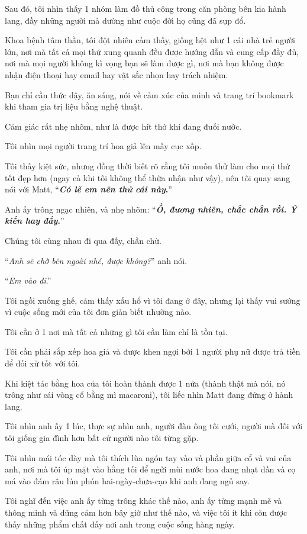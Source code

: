 \documentclass{article}
\begin{document}
Sau đó, tôi nhìn thấy 1 nhóm làm đồ thủ công trong căn phòng bên kia hành lang, đầy những người mà dường như cuộc đời họ cũng đã sụp đổ.

%
Khoa bệnh tâm thần, tôi đột nhiên cảm thấy, giống hệt như 1 cái nhà trẻ người lớn, nơi mà tất cả mọi thứ xung quanh đều được hướng dẫn và cung cấp đầy đủ, nơi mà mọi người không kì vọng bạn sẽ làm được gì, nơi mà bạn không được nhận điện thoại hay email hay vật sắc nhọn hay trách nhiệm.

Bạn chỉ cần thức dậy, ăn sáng, nói về cảm xúc của mình và trang trí bookmark khi tham gia trị liệu bằng nghệ thuật.

Cảm giác rất nhẹ nhõm, như là được hít thở khi đang đuối nước.

Tôi nhìn mọi người trang trí hoa giả lên mấy cục xốp.

Tôi thấy kiệt sức, nhưng đồng thời biết rõ rằng tôi muốn thử làm cho mọi thứ tốt đẹp hơn (ngay cả khi tôi không thể thừa nhận như vậy), nên tôi quay sang nói với Matt, ``\textbf{\textit{Có lẽ em nên thử cái này}.}''

Anh ấy trông ngạc nhiên, và nhẹ nhõm: ``\textbf{\textit{Ồ, đương nhiên, chắc chắn rồi. Ý kiến hay đấy}.}''

%
Chúng tôi cùng nhau đi qua đấy, chần chừ.

``\textit{Anh sẽ chờ bên ngoài nhé, được không?}'' anh nói.

``\textit{Em vào đi}.''

Tôi ngồi xuống ghế, cảm thấy xấu hổ vì tôi đang ở đây, nhưng lại thấy vui sướng vì cuộc sống mới của tôi đơn giản biết nhường nào.

Tôi cần ở 1 nơi mà tất cả những gì tôi cần làm chỉ là tồn tại.

Tôi cần phải sắp xếp hoa giả và được khen ngợi bởi 1 người phụ nữ được trả tiền để đối xử tốt với tôi.

Khi kiệt tác bằng hoa của tôi hoàn thành được 1 nửa (thành thật mà nói, nó trông như cái vòng cổ bằng mì macaroni), tôi liếc nhìn Matt đang đứng ở hành lang.

Tôi nhìn anh ấy 1 lúc, thực sự nhìn anh, người đàn ông tôi cưới, người mà đối với tôi giống gia đình hơn bất cứ người nào tôi từng gặp.

%
Tôi nhìn mái tóc dày mà tôi thích lùa ngón tay vào và phần giữa cổ và vai của anh, nơi mà tôi úp mặt vào hằng tối để ngửi mùi nước hoa đang nhạt dần và cọ má vào đám râu lún phún hai-ngày-chưa-cạo khi anh đang ngủ say.

Tôi nghĩ đến việc anh ấy từng trông khác thế nào, anh ấy từng mạnh mẽ và thông minh và dũng cảm hơn bây giờ như thế nào, và việc tôi ít khi còn được thấy những phẩm chất đấy nơi anh trong cuộc sống hàng ngày.
\end{document}
